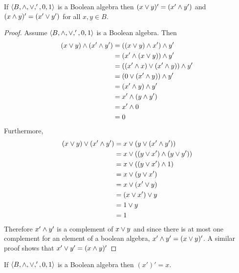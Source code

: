 \begin{theorem*}
If $\langle B, \wedge, \vee, ', 0 , 1\rangle$ is a Boolean algebra then $(x \vee y)' = (x' \wedge y')$ and $(x \wedge y)' = (x' \vee y')$ for all $x, y\in B$.
\end{theorem*}
\begin{proof}
Assume $\langle B, \wedge, \vee, ', 0 , 1\rangle$ is a Boolean algebra.
Then
\begin{align*}
(x\vee y) \wedge (x' \wedge y') &= ((x\vee y) \wedge x') \wedge y' \\
                               &= (x' \wedge  (x\vee y)) \wedge y' \\
                               &= ((x' \wedge x) \vee (x' \wedge y)) \wedge y' \\
                               &= (0 \vee (x' \wedge y)) \wedge y' \\
                               &= (x' \wedge y) \wedge y' \\
                               &= x' \wedge (y \wedge y') \\
                               &= x' \wedge 0 \\
                               &= 0 
\end{align*}
Furthermore,
\begin{align*}
(x\vee y) \vee (x' \wedge y') &= x\vee (y \vee (x' \wedge y')) \\
                               &= x\vee ((y \vee x') \wedge (y \vee y')) \\
                               &= x\vee ((y \vee x') \wedge 1) \\
                               &= x\vee (y \vee x') \\
                               &= x\vee (x' \vee y) \\
                               &= (x\vee x') \vee y \\
                               &= 1 \vee y \\
                               &= 1
\end{align*}
Therefore $x' \wedge y'$ is a complement of $x\vee y$ and since there is at most one complement for an element of a boolean algebra, $x' \wedge y' = (x\vee y)'$. A similar proof shows that $x' \vee y' = (x\wedge y)'$
\end{proof}

\begin{theorem*}
If $\langle B, \wedge, \vee, ', 0 , 1\rangle$ is a Boolean algebra then $(x')' = x$.
\end{theorem*}

